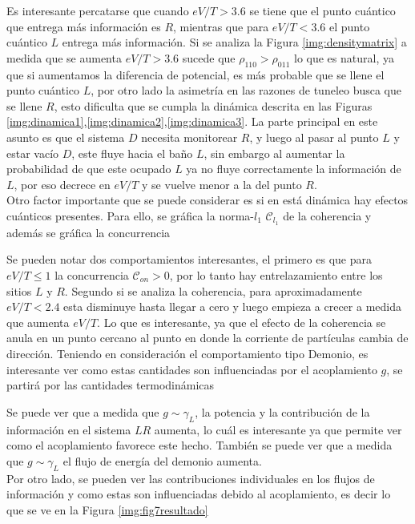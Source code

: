 Es interesante percatarse que cuando $eV/T>3.6$ se tiene que el punto cuántico que entrega más información es $R$, mientras que para $eV/T<3.6$ el punto cuántico $L$ entrega más información. Si se analiza la Figura \ref{img:densitymatrix} a medida que se aumenta $eV/T>3.6$ sucede que $\rho_{110}>\rho_{011}$ lo que es natural, ya que si aumentamos la diferencia de potencial, es más probable que se llene el punto cuántico $L$, por otro lado la asimetría en las razones de tuneleo busca que se llene $R$, esto dificulta que se cumpla la dinámica descrita en las Figuras \ref{img:dinamica1},\ref{img:dinamica2},\ref{img:dinamica3}. La parte principal en este asunto es que el sistema $D$ necesita monitorear $R$, y luego al pasar al punto $L$ y estar vacío $D$, este fluye hacia el baño $L$, sin embargo al aumentar la probabilidad de que este ocupado $L$ ya no fluye correctamente la información de $L$, por eso decrece en $eV/T$ y se vuelve menor a la del punto $R$.
\\
Otro factor importante que se puede considerar es si en está dinámica hay efectos cuánticos presentes. Para ello, se gráfica la norma-$l_{1}$ $\mathcal{C}_{l_{1}}$ de la coherencia y además se gráfica la concurrencia 


Se pueden notar dos comportamientos interesantes, el primero es que para $eV/T \leq 1$ la concurrencia $\mathcal{C}_{on}>0$, por lo tanto hay entrelazamiento entre los sitios $L$ y $R$. Segundo si se analiza la coherencia, para aproximadamente $eV/T<2.4$ esta disminuye hasta llegar a cero y luego empieza a crecer a medida que aumenta $eV/T$. Lo que es interesante, ya que el efecto de la coherencia se anula en un punto cercano al punto en donde la corriente de partículas cambia de dirección. Teniendo en consideración el comportamiento tipo Demonio, es interesante ver como estas cantidades son influenciadas por el acoplamiento $g$, se partirá por las cantidades termodinámicas 


Se puede ver que a medida que $g\sim \gamma_{L}$, la potencia y la contribución de la información en el sistema $LR$ aumenta, lo cuál es interesante ya que permite ver como el acoplamiento favorece este hecho. También se puede ver que a medida que $g\sim \gamma_{L}$ el flujo de energía del demonio aumenta.\\
Por otro lado, se pueden ver las contribuciones individuales en los flujos de información y como estas son influenciadas debido al acoplamiento, es decir lo que se ve en la Figura \ref{img:fig7resultado}

